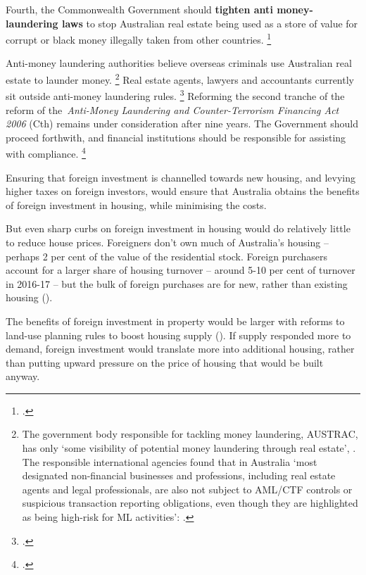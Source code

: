 Fourth, the Commonwealth Government should \textbf{tighten anti money-laundering laws} to stop Australian real estate being used as a store of value for corrupt or black money illegally taken from other countries.%
	\footcite{FATF-APG-2015-Anti-money-laundering-counter-terrorist-finance-measures-Aust}

Anti-money laundering authorities believe overseas criminals use Australian real estate to launder money.%
	\footnote{The government body responsible for tackling money laundering, AUSTRAC, has only `some visibility of potential money laundering through real estate', \textcite{AUSTRAC2015RealEstate}.
	The responsible international agencies found that in Australia `most designated non-financial businesses and professions, including real estate agents and legal professionals, are also not subject to AML/CTF controls or suspicious transaction reporting obligations, even though they are highlighted as being high-risk for ML activities': \textcite[][9, 13]{FATF-APG-2015-Anti-money-laundering-counter-terrorist-finance-measures-Aust}.}
Real estate agents, lawyers and accountants currently sit outside anti-money laundering rules.%
	\footcites{AG-2016-Report-on-review-of-Anti-money-laundering-Act}{AG-2016-Consult-paper-real-estate-professionals}
Reforming the second tranche of the reform of the~\emph{Anti-Money Laundering and Counter-Terrorism Financing Act 2006} (Cth) remains under consideration after nine years.
The Government should proceed forthwith, and financial institutions should be responsible for assisting with compliance.%
	\footcite{AUSTRAC2015RealEstate}

Ensuring that foreign investment is channelled towards new housing, and levying higher taxes on foreign investors, would ensure that Australia obtains the benefits of foreign investment in housing, while minimising the costs.

But even sharp curbs on foreign investment in housing would do relatively little to reduce house prices.
Foreigners don't own much of Australia's housing -- perhaps 2 per cent of the value of the residential stock.
Foreign purchasers account for a larger share of housing turnover -- around 5-10 per cent of turnover in 2016-17 -- but the bulk of foreign purchases are for new, rather than existing housing ().

The benefits of foreign investment in property would be larger with reforms to land-use planning rules to boost housing supply ().
If supply responded more to demand, foreign investment would translate more into additional housing, rather than putting upward pressure on the price of housing that would be built anyway.


